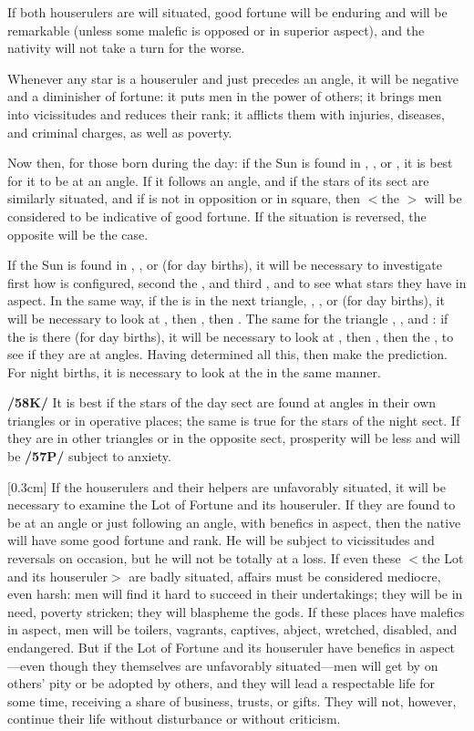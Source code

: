 If both houserulers are will situated, good fortune will be enduring and will be remarkable (unless some malefic is opposed or in superior aspect), and the nativity will not take a turn for the worse. 

Whenever any star is a houseruler and just precedes an angle, it will be negative and a diminisher of fortune: it puts men in the power of others; it brings men into vicissitudes and reduces their rank; it afflicts them with injuries, diseases, and criminal charges, as well as poverty.

Now then, for those born during the day: if the Sun is found in \Aries, \Leo, or \Sagittarius, it is best for it to be at an angle. If it follows an angle, and if the stars of its sect are similarly situated, and if \Mars\xspace is not in opposition or in square, then $<$the \Sun$>$ will be considered to be indicative of good fortune. If the situation is reversed, the opposite will be the case. 

If the Sun is found in \Taurus, \Virgo, or \Capricorn\xspace (for day births), it will be necessary to investigate first how \Venus\xspace is configured, second the \Moon, and third
\Mars, and to see what stars they have in aspect. In the same way, if the \Sun\xspace is in the next triangle, \Gemini, \Libra, or \Aquarius\xspace (for day births), it will be necessary to look at \Saturn, then \Mercury, then \Jupiter. The same for the triangle \Cancer, \Scorpio, and \Pisces: if the \Sun\xspace is there (for day births), it will be necessary to look at \Venus, then \Mars, then the \Moon, to see if they are at angles. Having determined all this, then make the prediction. For night births, it is necessary to look at the \Moon\xspace in the same manner.

\mndl[0.2cm]
\textbf{/58K/} It is best if the stars of the day sect are found at angles in their own triangles or in operative
places; the same is true for the stars of the night sect. If they are in other triangles or in the opposite sect, prosperity will be less and will be \textbf{/57P/} subject to anxiety. 

\marginnote{\Fortune}[0.3cm]
If the houserulers and their helpers are unfavorably situated, it will be necessary to examine the Lot of Fortune and its houseruler. If they are found to be at an angle or just following an angle, with benefics in aspect, then the native will have some good fortune and rank. He will be subject to vicissitudes and reversals on occasion, but he will not be
totally at a loss. If even these $<$the Lot and its houseruler$>$ are badly situated, affairs must be considered
mediocre, even harsh: men will find it hard to succeed in their undertakings; they will be in need, poverty stricken;
they will blaspheme the gods. If these places have malefics in aspect, men will be toilers, vagrants, captives, abject, wretched, disabled, and endangered. But if the Lot of Fortune and its houseruler have benefics in aspect—even though they themselves are unfavorably situated—men will get by on others’
pity or be adopted by others, and they will lead a respectable life for some time, receiving a share of business, trusts, or gifts. They will not, however, continue their life without disturbance or without criticism.

